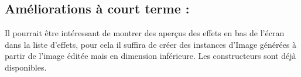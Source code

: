 \subsection{Améliorations à court terme :}
Il pourrait être intéressant de montrer des aperçus des effets en bas de l'écran dans la liste d'effets, pour cela il suffira de créer des instances d'Image générées à partir de l'image éditée mais en dimension inférieure. Les constructeurs sont déjà disponibles.
\\